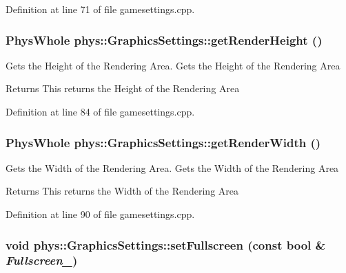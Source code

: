 Definition at line 71 of file gamesettings.cpp.\hypertarget{classphys_1_1GraphicsSettings_a3f44f36cf226bfff2f80bc6edf577cab}{
\subsubsection[{getRenderHeight}]{\setlength{\rightskip}{0pt plus 5cm}PhysWhole phys::GraphicsSettings::getRenderHeight ()}}
\label{dc/df1/classphys_1_1GraphicsSettings_a3f44f36cf226bfff2f80bc6edf577cab}


Gets the Height of the Rendering Area. Gets the Height of the Rendering Area \begin{DoxyReturn}{Returns}
This returns the Height of the Rendering Area 
\end{DoxyReturn}


Definition at line 84 of file gamesettings.cpp.\hypertarget{classphys_1_1GraphicsSettings_a7e66859d70c88cd263c3bd6e9814069d}{
\subsubsection[{getRenderWidth}]{\setlength{\rightskip}{0pt plus 5cm}PhysWhole phys::GraphicsSettings::getRenderWidth ()}}
\label{dc/df1/classphys_1_1GraphicsSettings_a7e66859d70c88cd263c3bd6e9814069d}


Gets the Width of the Rendering Area. Gets the Width of the Rendering Area \begin{DoxyReturn}{Returns}
This returns the Width of the Rendering Area 
\end{DoxyReturn}


Definition at line 90 of file gamesettings.cpp.\hypertarget{classphys_1_1GraphicsSettings_aba9e127ab2cf3f20604313e39d32f7a8}{
\subsubsection[{setFullscreen}]{\setlength{\rightskip}{0pt plus 5cm}void phys::GraphicsSettings::setFullscreen (const bool \& {\em Fullscreen\_\-})}}
\label{dc/df1/classphys_1_1GraphicsSettings_aba9e127ab2cf3f20604313e39d32f7a8}



